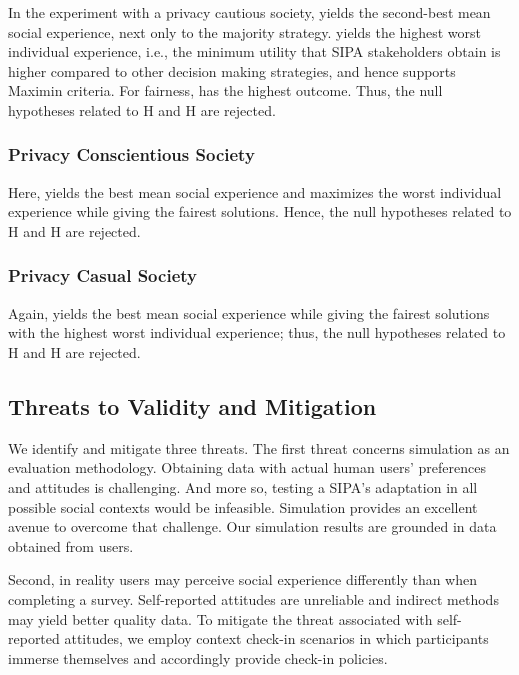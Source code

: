
In the experiment with a privacy cautious society, \frameworkAinur yields the second-best mean social experience, next only to the majority strategy. \frameworkAinur yields the highest worst individual experience, i.e., the minimum utility that SIPA stakeholders obtain is higher compared to other decision making strategies, and hence supports Maximin criteria. For fairness, \frameworkAinur has the highest outcome. Thus, the null hypotheses related to H and H are rejected. 

\subsubsection{Privacy Conscientious Society}

Here, \frameworkAinur yields the best mean social experience and maximizes the worst individual experience while giving the fairest solutions. Hence, the null hypotheses related to H and H are rejected.

\subsubsection{Privacy Casual Society}

Again, \frameworkAinur yields the best mean social experience while giving the fairest solutions with the highest worst individual experience; thus, the null hypotheses related to H and H are rejected. 

\subsection{Threats to Validity and Mitigation}

We identify and mitigate three threats. 
%
The first threat concerns simulation as an evaluation methodology. Obtaining data with actual human users' preferences and attitudes is challenging. And more so, testing a SIPA's adaptation
in all possible social contexts would be infeasible. Simulation provides an excellent avenue to overcome that challenge. Our simulation results are grounded in data obtained from users. 

Second, in reality users may perceive social experience differently than when completing a survey. Self-reported attitudes are unreliable and indirect methods may yield better quality data. To mitigate the threat associated with self-reported attitudes, we employ context check-in scenarios in which participants immerse themselves and accordingly provide check-in policies.

